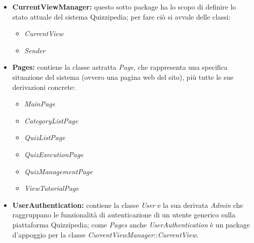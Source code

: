 \documentclass[a4paper,11pt]{article}
\begin{document}
	\begin{itemize}
		\item\textbf{CurrentViewManager:} questo sotto package ha lo scopo di definire lo stato attuale del sistema Quizzipedia; per fare ciò si avvale delle classi:
			\begin{itemize}
				\item\textit{CurrentView}%
				\item\textit{Sender}%
			\end{itemize}
		\item\textbf{Pages:} contiene la classe astratta \textit{Page}, che rappresenta una specifica situazione del sistema (ovvero una pagina web del sito), più tutte le sue derivazioni concrete:
			\begin{itemize}
				\item\textit{MainPage}%
				\item\textit{CategoryListPage}%
				\item\textit{QuizListPage}%
				\item\textit{QuizExecutionPage}%
				\item\textit{QuizManagementPage}%
				\item\textit{ViewTutorialPage}%
			\end{itemize}
		\item\textbf{UserAuthentication:} contiene la classe \textit{User} e la sua derivata \textit{Admin} che raggruppano le funzionalità di autenticazione di un utente generico sulla piattaforma Quizzipedia; come \textit{Pages} anche \textit{UserAuthentication} è un package d'appoggio per la classe \textit{CurrentViewManager}::\textit{CurrentView}.\\
		\\
	\end{itemize}
\end{document}
